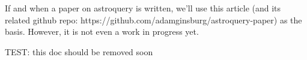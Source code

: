 If and when a paper on astroquery is written, we'll use this article (and its
related github repo: https://github.com/adamginsburg/astroquery-paper) as the
basis.  However, it is not even a work in progress yet.

TEST: this doc should be removed soon

